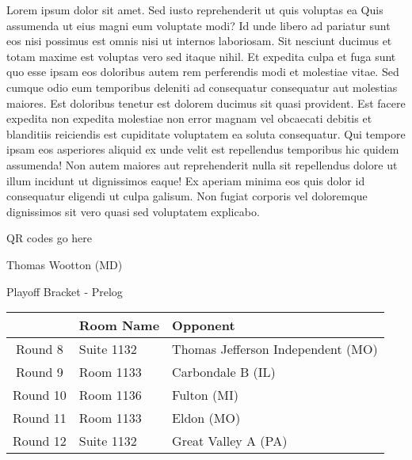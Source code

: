 \documentclass{article}%
\begin{document}
\vspace*{8pt}%
\linebreak%
\newline%
\newline%
Lorem ipsum dolor sit amet. Sed iusto reprehenderit ut quis voluptas ea Quis assumenda ut eius magni eum voluptate modi? Id unde libero ad pariatur sunt eos nisi possimus est omnis nisi ut internos laboriosam. Sit nesciunt ducimus et totam maxime est voluptas vero sed itaque nihil. Et expedita culpa et fuga sunt quo esse ipsam eos doloribus autem rem perferendis modi et molestiae vitae.\newline%
\newline%
Sed cumque odio eum temporibus deleniti ad consequatur consequatur aut molestias maiores. Est doloribus tenetur est dolorem ducimus sit quasi provident. Est facere expedita non expedita molestiae non error magnam vel obcaecati debitis et blanditiis reiciendis est cupiditate voluptatem ea soluta consequatur. Qui tempore ipsam eos asperiores aliquid ex unde velit est repellendus temporibus hic quidem assumenda!\newline%
\newline%
Non autem maiores aut reprehenderit nulla sit repellendus dolore ut illum incidunt ut dignissimos eaque! Ex aperiam minima eos quis dolor id consequatur eligendi ut culpa galisum. Non fugiat corporis vel doloremque dignissimos sit vero quasi sed voluptatem explicabo.\newline%
\newline%
%
\vspace*{30pt}%
\begin{center}%
\begin{Huge}%
QR codes go here%
\end{Huge}%
\end{center}%
\newpage%
\begin{center}%
\begin{Huge}%
Thomas Wootton (MD)%
\end{Huge}%
\vspace*{8pt}%
\linebreak%
\begin{Large}%
Playoff Bracket {-} Prelog%
\end{Large}%
\end{center}%
%
\begin{tabularx}{\textwidth}{|c|Y|Y|}%
\hline%
&Room Name&Opponent\\%
\hline%
Round 8&Suite 1132&Thomas Jefferson Independent (MO)\\%
Round 9&Room 1133&Carbondale B (IL)\\%
Round 10&Room 1136&Fulton (MI)\\%
Round 11&Room 1133&Eldon (MO)\\%
Round 12&Suite 1132&Great Valley A (PA)\\%
\hline%
\end{tabularx}%
\end{document}

